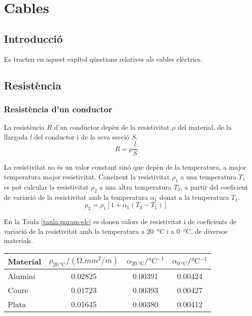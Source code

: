 \chapter{Cables}

\section{Introducció}
Es tracten en aquest capítol qüestions relatives als cables elèctrics.

\section{Resistència}

\subsection{Resistència d'un conductor}

La resistència $R$ d'un conductor depèn de la resistivitat $\rho$
del material, de la llargada $l$ del conductor i de la seva secció
$S$.
\begin{equation}
   R= \rho \frac{l}{S}
\end{equation}
\index{$\rho$}

La resistivitat no
és un valor constant sinó que depèn de la temperatura, a major
temperatura major resistivitat. Coneixent la resistivitat $\rho_1$ a una
temperatura $T_1$ es pot calcular la resistivitat $\rho_2$ a una altra
temperatura $T_2$, a partir del coeficient de variació de la
resistivitat amb la temperatura $\alpha_1$ donat a la temperatura $T_1$.
\begin{equation}
   \rho_2 = \rho_1 [1 + \alpha_1 (T_2 - T_1)]\label{eq:resistivitat}
\end{equation}
\index{$\alpha$}

En la Taula
\vref{taula:param-elc} es donen valors de resistivitat i de
coeficients de variació de la resistivitat amb la temperatura a
\SI{20}{\celsius} i a \SI{0}{\celsius}, de diversos materials.

\begin{center}
   \label{taula:param-elc}
   \begin{tabular}{lccc}
   \toprule[1pt]
   Material & $\rho_{\SI{20}{\celsius}} / (\si{\ohm.mm^2/m})$ & $\alpha_{\SI{20}{\celsius}} / \si{\celsius^{-1}}$ &
   $\alpha_{\SI{0}{\celsius}} / \si{\celsius^{-1}}$
   \\
   \midrule
      Alumini & \num{0,02825} & \num{0,00391} & \num{0,00424} \\
      Coure   & \num{0,01723} & \num{0,00393} & \num{0,00427} \\
      Plata   & \num{0,01645} & \num{0,00380} & \num{0,00412} \\
   \bottomrule[1pt]
   \end{tabular}
\end{center}

